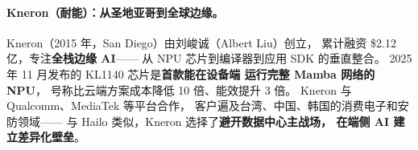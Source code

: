 \paragraph{Kneron（耐能）：从圣地亚哥到全球边缘。}
Kneron（2015 年，San Diego）由刘峻诚（Albert Liu）创立，
累计融资 \$2.12 亿，专注\textbf{全栈边缘 AI}——
从 NPU 芯片到编译器到应用 SDK 的垂直整合。
2025 年 11 月发布的 KL1140 芯片是\textbf{首款能在设备端
运行完整 Mamba 网络的 NPU}，
号称比云端方案成本降低 10 倍、能效提升 3 倍。
Kneron 与 Qualcomm、MediaTek 等平台合作，
客户遍及台湾、中国、韩国的消费电子和安防领域——
与 Hailo 类似，Kneron 选择了\textbf{避开数据中心主战场，
在端侧 AI 建立差异化壁垒}。

